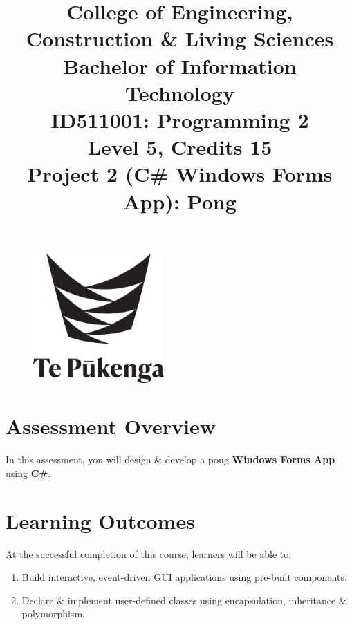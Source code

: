 \documentclass{article}
\author{}
\begin{document}
\begin{figure}
    \centering
    \includegraphics[width=50mm]{../../resources/img/logo.png}
\end{figure}

\title{College of Engineering, Construction \& Living Sciences\\Bachelor of Information Technology\\ID511001: Programming 2\\Level 5, Credits 15\\\textbf{Project 2 (C\# Windows Forms App): Pong}}
\date{}
\maketitle

\section*{Assessment Overview}
In this assessment, you will design \& develop a pong \textbf{Windows Forms App} using \textbf{C\#}.

\section*{Learning Outcomes}
At the successful completion of this course, learners will be able to:
\begin{enumerate}
    \item Build interactive, event-driven GUI applications using pre-built components.
    \item Declare \& implement user-defined classes using encapsulation, inheritance \& polymorphism.
\end{enumerate}
\end{document}
